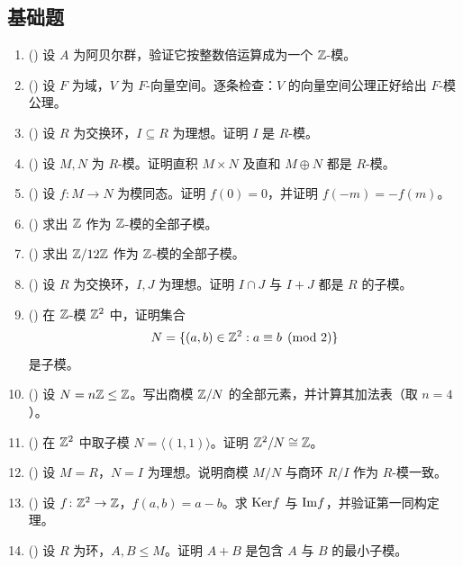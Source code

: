 \subsection*{基础题}

\begin{enumerate}[label=\textbf{10.\arabic*.}, leftmargin=3.2em]
  \item (\basic) 设 $A$ 为阿贝尔群，验证它按整数倍运算成为一个 $\mathbb{Z}$-模。

  \item (\basic) 设 $F$ 为域，$V$ 为 $F$-向量空间。逐条检查：$V$ 的向量空间公理正好给出 $F$-模公理。

  \item (\basic) 设 $R$ 为交换环，$I\subseteq R$ 为理想。证明 $I$ 是 $R$-模。

  \item (\basic) 设 $M,N$ 为 $R$-模。证明直积 $M\times N$ 及直和 $M\oplus N$ 都是 $R$-模。

  \item (\basic) 设 $f\colon M\to N$ 为模同态。证明 $f(0)=0$，并证明 $f(-m)=-f(m)$。

  \item (\basic) 求出 $\mathbb{Z}$ 作为 $\mathbb{Z}$-模的全部子模。

  \item (\basic) 求出 $\mathbb{Z}/12\mathbb{Z}$ 作为 $\mathbb{Z}$-模的全部子模。

  \item (\basic) 设 $R$ 为交换环，$I,J$ 为理想。证明 $I\cap J$ 与 $I+J$ 都是 $R$ 的子模。

  \item (\basic) 在 $\mathbb{Z}$-模 $\mathbb{Z}^2$ 中，证明集合
  \[
  N=\{(a,b)\in \mathbb{Z}^2: a\equiv b\pmod 2\}
  \]
  是子模。

  \item (\basic) 设 $N=n\mathbb{Z}\le \mathbb{Z}$。写出商模 $\mathbb{Z}/N$ 的全部元素，并计算其加法表（取 $n=4$）。

  \item (\basic) 在 $\mathbb{Z}^2$ 中取子模 $N=\langle (1,1)\rangle$。证明 $\mathbb{Z}^2/N\cong \mathbb{Z}$。

  \item (\basic) 设 $M=R$，$N=I$ 为理想。说明商模 $M/N$ 与商环 $R/I$ 作为 $R$-模一致。

  \item (\basic) 设 $f\colon \mathbb{Z}^2\to \mathbb{Z}$，$f(a,b)=a-b$。求 $\mathrm{Ker} f$ 与 $\mathrm{Im} f$，并验证第一同构定理。

  \item (\basic) 设 $R$ 为环，$A,B\le M$。证明 $A+B$ 是包含 $A$ 与 $B$ 的最小子模。


\end{enumerate}
